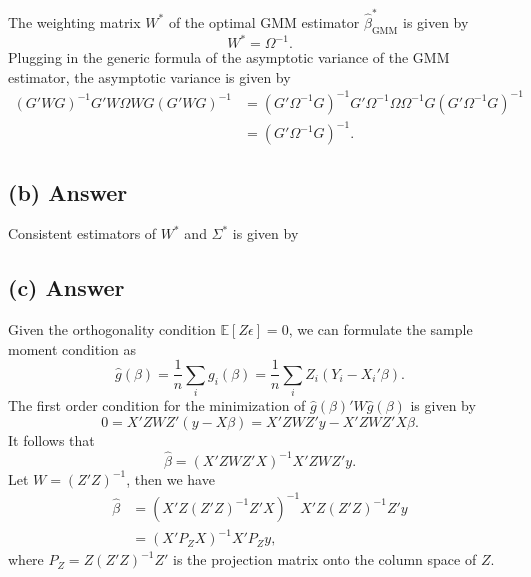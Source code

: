 \documentclass[11pt]{article}
\theoremstyle{definition}
\theoremstyle{boldtitle} %
\numberwithin{equation}{section}
\numberwithin{figure}{section}
\numberwithin{table}{section}
\begin{document}
The weighting matrix $W^*$ of the optimal GMM estimator $\hat{\beta}^*_{\text{GMM}}$ is given by 
\[
W^* = \Omega^{-1}.
\]
Plugging in the generic formula of the asymptotic variance of the GMM estimator,
the asymptotic variance is given by 
\begin{align*}
    (G'WG)^{-1}G'W\Omega W G(G'WG)^{-1} 
    & = (G'\Omega^{-1}G)^{-1}G'\Omega^{-1}\Omega \Omega^{-1} G(G'\Omega^{-1}G)^{-1} \\
    & = (G'\Omega^{-1}G)^{-1}.
\end{align*}


\subsection{(b) Answer}
Consistent estimators of $W^*$ and $\Sigma^*$ is given by 


\subsection{(c) Answer}
Given the orthogonality condition $\mathbb{E}[Z\epsilon] = 0$, we can formulate the sample moment condition as
\[
\hat{g}(\beta) = \frac{1}{n} \sum_i g_i(\beta) = \frac{1}{n} \sum_i Z_i (Y_i - X_i'\beta).
\]
The first order condition for the minimization of $\hat{g}(\beta)' W \hat{g}(\beta)$ is given by
\[
0 = X'Z W Z'(y - X\beta) = X'Z W Z' y - X'Z W Z' X \beta.
\]
It follows that 
\[
\hat{\beta} = \left( X'Z W Z' X \right)^{-1} X'Z W Z' y.
\]
Let $W = (Z'Z)^{-1}$, then we have
\begin{align*}
\hat{\beta} & = \left( X'Z (Z'Z)^{-1} Z' X \right)^{-1} X'Z (Z'Z)^{-1} Z' y \\ 
    & = \left( X' P_Z X \right)^{-1} X' P_Z y,
\end{align*}
where $P_Z = Z(Z'Z)^{-1}Z'$ is the projection matrix onto the column space of $Z$.



\end{document}
